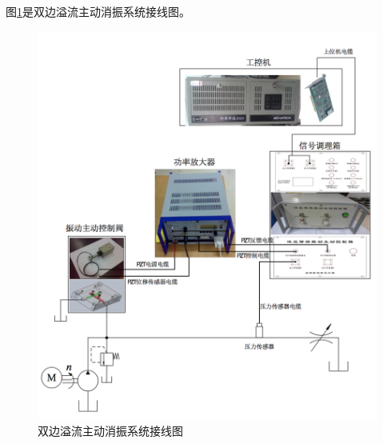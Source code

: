 \documentclass[12pt]{article}
\begin{document}
图\ref{fig:fig16}是双边溢流主动消振系统接线图。
\begin{figure}[H]
\begin{center}
\includegraphics[width=0.9\linewidth]{./images/系统接线图.png}
\caption{双边溢流主动消振系统接线图}
\label{fig:fig16}
\end{center}
\end{figure}

\newpage
{\small


}
\end{document}
